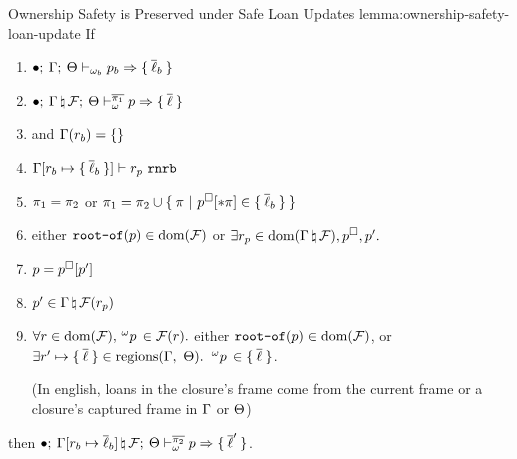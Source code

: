 \begin{oxlemma}{Ownership Safety is Preserved under Safe Loan Updates}
  {lemma:ownership-safety-loan-update} If
  \begin{enumerate}
  \item $\bullet; \: \Gamma; \: \Theta \vdash_{\omega_b} p_b \Rightarrow \{ \: \overline{\ell}_b \: \}$
  \item $\bullet; \: \Gamma \, \natural \, \mathcal{F}; \: \Theta \vdash^{\overline{\pi_1}}_{\omega} p \Rightarrow \{ \: \overline{\ell} \: \}$
   \item and $\Gamma(r_b) = \{\}$
   \item $\Gamma[r_b \mapsto \{ \: \overline{\ell}_b \: \}] \vdash r_p \ \mathtt{rnrb}$
  \item $\pi_1 = \pi_2$ or $\pi_1 = \pi_2 \cup \{ \: \pi
    \ | \ p^\square[* \pi] \in
    \{ \: \overline{\ell}_b \: \} \: \}$
  \item either $\texttt{root-of}(p) \in \textrm{dom}(\mathcal{F})$ or
  $\exists r_{p} \in \textrm{dom}(\Gamma \, \natural \, \mathcal{F}), p^\square, p^\prime.$
  \item $p = p^\square[p^\prime]$
  \item $p^\prime \in \Gamma \, \natural \, \mathcal{F}(r_p)$
  \item $\forall r \in \textrm{dom}(\mathcal{F}),
    \,^{\omega}p\, \in \mathcal{F}(r).$ either
    $\texttt{root-of}(p) \in \textrm{dom}(\mathcal{F})$, or $\exists r^\prime \mapsto \{ \: \overline{\ell} \: \} \in
    \textrm{regions}(\Gamma,\ \Theta).$ $\,^{\omega}p\, \in \{ \: \overline{\ell} \: \}$.

      (In english, loans in the closure's frame come from the current frame or a closure's captured frame in $\Gamma$ or $\Theta$)
  \end{enumerate}
  then $\bullet; \: \Gamma[r_b \mapsto
        \overline{\ell}_b] \, \natural \, \mathcal{F}; \: \Theta \vdash^{\overline{\pi_2}}_{\omega} p \Rightarrow \{ \: \overline{\ell}^\prime \: \}$.
\end{oxlemma}

